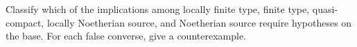 \begin{problem}\label{chal:vi26-05}
Classify which of the implications among locally finite type, finite type, quasi-compact, locally Noetherian source, and Noetherian source require hypotheses on the base.  For each false converse, give a counterexample.
\end{problem}
